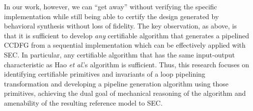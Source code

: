 
In our work, however, we can ``get away'' without verifying
the specific implementation while still being able to
certify the design generated by behavioral synthesis without
loss of fidelity. The key observation, as above, is that it
is sufficient to develop {\em any} certifiable algorithm
that generates a pipelined CCDFG from a sequential
implementation which can be effectively applied with SEC.
In particular, any certifiable algorithm that has the same
input-output characteristic as Hao {\em et al}.'s algorithm
is sufficient.  Thus, this research focuses on identifying
certifiable primitives and invariants of a loop pipelining
transformation and developing a pipeline generation
algorithm using those primitives, achieving the dual goal of
mechanical reasoning of the algorithm and amenability of the
resulting reference model to SEC.







